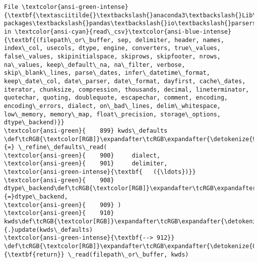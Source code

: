 \documentclass[11pt]{article}
\begin{document}
\begin{Verbatim}[commandchars=\\\{\}, frame=single, framerule=2mm, rulecolor=\color{outerrorbackground}]
File \textcolor{ansi-green-intense}{\textbf{\textasciitilde{}\textbackslash{}anaconda3\textbackslash{}Lib\textbackslash{}site-packages\textbackslash{}pandas\textbackslash{}io\textbackslash{}parsers\textbackslash{}readers.py:912}}, in \textcolor{ansi-cyan}{read\_csv}\textcolor{ansi-blue-intense}{\textbf{(filepath\_or\_buffer, sep, delimiter, header, names, index\_col, usecols, dtype, engine, converters, true\_values, false\_values, skipinitialspace, skiprows, skipfooter, nrows, na\_values, keep\_default\_na, na\_filter, verbose, skip\_blank\_lines, parse\_dates, infer\_datetime\_format, keep\_date\_col, date\_parser, date\_format, dayfirst, cache\_dates, iterator, chunksize, compression, thousands, decimal, lineterminator, quotechar, quoting, doublequote, escapechar, comment, encoding, encoding\_errors, dialect, on\_bad\_lines, delim\_whitespace, low\_memory, memory\_map, float\_precision, storage\_options, dtype\_backend)}}
\textcolor{ansi-green}{    899} kwds\_defaults \def\tcRGB{\textcolor[RGB]}\expandafter\tcRGB\expandafter{\detokenize{98,98,98}}{=} \_refine\_defaults\_read(
\textcolor{ansi-green}{    900}     dialect,
\textcolor{ansi-green}{    901}     delimiter,
\textcolor{ansi-green-intense}{\textbf{   ({\ldots})}}
\textcolor{ansi-green}{    908}     dtype\_backend\def\tcRGB{\textcolor[RGB]}\expandafter\tcRGB\expandafter{\detokenize{98,98,98}}{=}dtype\_backend,
\textcolor{ansi-green}{    909} )
\textcolor{ansi-green}{    910} kwds\def\tcRGB{\textcolor[RGB]}\expandafter\tcRGB\expandafter{\detokenize{98,98,98}}{.}update(kwds\_defaults)
\textcolor{ansi-green-intense}{\textbf{--> 912}} \def\tcRGB{\textcolor[RGB]}\expandafter\tcRGB\expandafter{\detokenize{0,135,0}}{\textbf{return}} \_read(filepath\_or\_buffer, kwds)


\end{Verbatim}
\end{document}
